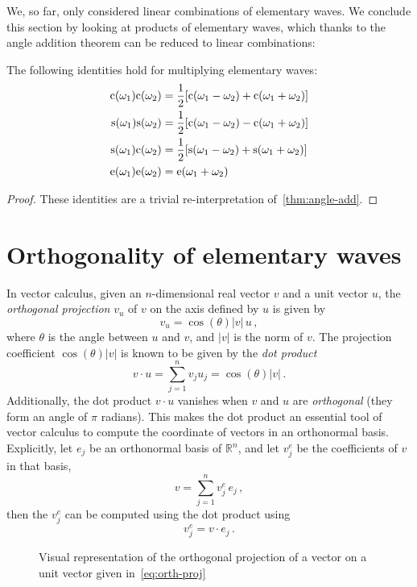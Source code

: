 We, so far, only considered linear combinations of elementary waves. We conclude this section by looking at products of elementary waves, which thanks to the angle addition theorem can be reduced to linear combinations:
\begin{proposition}
  The following identities hold for multiplying elementary waves:
  \begin{align}
    \mathrm{c}(\omega_1)\mathrm{c}(\omega_2)&=\frac{1}{2}[\mathrm{c}(\omega_1-\omega_2)+\mathrm{c}(\omega_1+\omega_2)]\label{eq:cprod}\\
    \mathrm{s}(\omega_1)\mathrm{s}(\omega_2)&=\frac{1}{2}[\mathrm{c}(\omega_1-\omega_2)-\mathrm{c}(\omega_1+\omega_2)]\label{eq:sprod}\\
    \mathrm{s}(\omega_1)\mathrm{c}(\omega_2)&=\frac{1}{2}[\mathrm{s}(\omega_1-\omega_2)+\mathrm{s}(\omega_1+\omega_2)]\label{eq:scprod}\\
    \mathrm{e}(\omega_1)\mathrm{e}(\omega_2)&=\mathrm{e}(\omega_1+\omega_2)\label{eq:eprod}
  \end{align}
\end{proposition}
\begin{proof}
  These identities are a trivial re-interpretation of~\cref{thm:angle-add}.
\end{proof}
\section{Orthogonality of elementary waves}
In vector calculus, given an $n$-dimensional real vector $v$ and a unit vector $u$, the \emph{orthogonal projection} $v_u$ of $v$ on the axis defined by $u$ is given by
\begin{equation}
  \label{eq:orth-proj}
  v_u=\cos(\theta)|v|\,u\,,
\end{equation}
where $\theta$ is the angle between $u$ and $v$, and $|v|$ is the norm of $v$. The projection coefficient $\cos(\theta)|v|$ is known to be
given by the \emph{dot product}
\begin{equation}
  v\cdot u=\sum_{j=1}^n v_j u_j=\cos(\theta)|v|\,.\label{eq:vec-dot}
\end{equation}
Additionally, the dot product $v\cdot u$ vanishes when $v$ and $u$ are \emph{orthogonal} (\ie they form an angle of $\pi$ radians). This makes the dot product an essential tool of vector calculus to compute the coordinate of vectors in an orthonormal basis. Explicitly, let $e_j$ be an orthonormal basis of $\mathbb{R}^n$, and let $v^{e}_j$ be the coefficients of $v$ in that basis, \ie
\begin{equation}
  v=\sum_{j=1}^{n}v^{e}_j\,e_j\,,
\end{equation}
then the $v^{e}_j$ can be computed using the dot product using
\begin{equation}
  v^{e}_j=v\cdot e_j\,.\label{eq:basis-proj}
\end{equation}
\begin{figure}[t]
  \caption{Visual representation of the orthogonal projection of a vector on a unit vector given in~\cref{eq:orth-proj}}
  \label{fig:orth-proj}
\end{figure}

